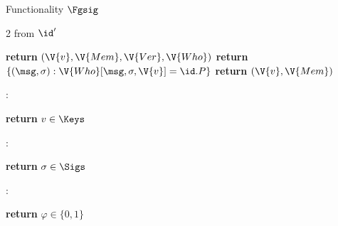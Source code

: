 \begin{interface}[nofloat]{Functionality $\Fgsig$ \\
}
{\begin{multicols}{2}
 \quad from $\id'$
\begin{algorithmic}[1]
\algcont
{}
  \State \textbf{return} $(\V{v}, \V{Mem}, \V{Ver}, \V{Who})$ \label{ln:gsgmleak}
\EndIf
{}
  \State \textbf{return} $\{(\msg, \sigma) : \V{Who}[\msg, \sigma, \V{v}] = \id.P\}$ \label{ln:gsownsigs}
\EndIf
\State \textbf{return} $(\V{v}, \V{Mem})$
\algsave
\end{algorithmic}
\vspace{1.4ex}

:
\begin{algorithmic}[1]
\algcont
\State \textbf{return} $v \in \Keys$
\algsave
\end{algorithmic}
\vspace{1.4ex}

\opsig{$\Clean_{\sigma}(\sigma)$}:
\begin{algorithmic}[1]
\algcont
\State \textbf{return} $\sigma \in \Sigs$
\algsave
\end{algorithmic}
\vspace{1.4ex}

:
\begin{algorithmic}[1]
\algcont
\State \textbf{return} $\varphi \in \{0,1\}$
\algsave
\end{algorithmic}
\end{multicols}}
\end{interface}
